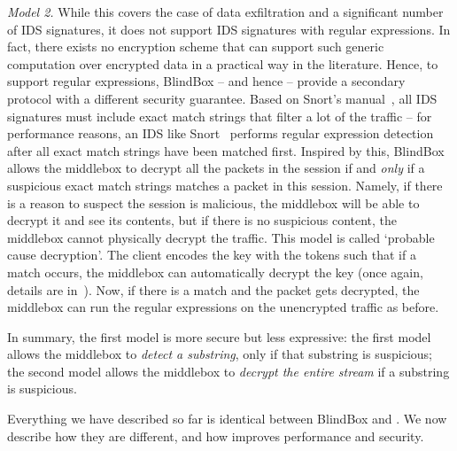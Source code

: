  {\em Model 2.}  While this covers the case of data exfiltration and a significant number of IDS signatures, it does not support  IDS signatures with regular expressions.
 In fact, there exists no encryption scheme that can support such generic computation over encrypted data in a practical way in the literature. 
  Hence, to support regular expressions, BlindBox -- and hence \sys -- provide a secondary protocol with a different security guarantee. 
  Based on Snort's manual~\cite{Snort}, all  IDS signatures must include exact match strings that filter a lot of the traffic -- for performance reasons, an IDS like Snort~\cite{Snort} performs regular expression detection after all exact match strings have been matched first.
  Inspired by this, BlindBox allows the middlebox to decrypt all the packets in the session if and {\it only} if a suspicious exact match strings matches a packet in this session.
  Namely, if there is a reason to suspect the session is malicious, the middlebox will be able to decrypt it and see its contents, but if there is no suspicious content, the middlebox cannot physically decrypt the traffic.  This model is called `probable cause decryption'.
  The client encodes the key with the tokens such that if a match occurs, the middlebox can automatically decrypt the key (once again, details are in~\cite{blindbox}).
  Now, if there is a match and the packet gets decrypted, the middlebox can run the regular expressions on the unencrypted traffic as before. 
  
  
  In summary, the first model is more secure but less expressive: 
  the first model allows the middlebox to {\it detect a substring}, only if that substring is suspicious;
  the second model allows the middlebox to {\it decrypt the entire stream} if a substring is suspicious.
  
  Everything we have described so far is identical between BlindBox and \sys. We now describe how they are different, and how \sys improves performance and security.

